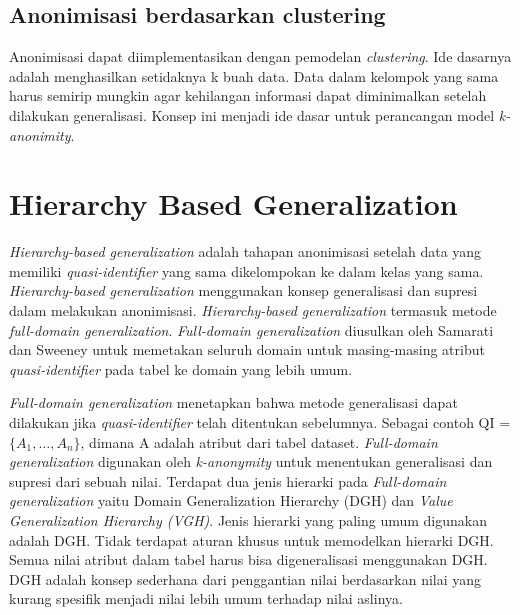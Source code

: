 \subsection{Anonimisasi berdasarkan clustering}
Anonimisasi dapat diimplementasikan dengan pemodelan \textit{clustering}. Ide dasarnya adalah menghasilkan setidaknya k buah data. Data dalam kelompok yang sama harus semirip mungkin agar kehilangan informasi dapat diminimalkan setelah dilakukan generalisasi. Konsep ini menjadi ide dasar untuk perancangan model \textit{k-anonimity}.

\section{Hierarchy Based Generalization} 
\label{theory:hierarchy_generalization}
\textit{Hierarchy-based generalization} adalah tahapan anonimisasi setelah data yang memiliki \textit{quasi-identifier} yang sama dikelompokan ke dalam kelas yang sama. \textit{Hierarchy-based generalization} menggunakan konsep generalisasi dan supresi dalam melakukan anonimisasi. \textit{Hierarchy-based generalization} termasuk metode \textit{full-domain generalization}. \textit{Full-domain generalization} diusulkan oleh Samarati dan Sweeney untuk memetakan seluruh domain untuk masing-masing atribut \textit{quasi-identifier} pada tabel ke domain yang lebih umum.

\par \textit{Full-domain generalization} menetapkan bahwa metode generalisasi dapat dilakukan jika \textit{quasi-identifier} telah ditentukan sebelumnya. Sebagai contoh QI = $\{A_1, \ldots , A_n\}$, dimana A adalah atribut dari tabel dataset. \textit{Full-domain generalization} digunakan oleh \textit{k-anonymity} untuk menentukan generalisasi dan supresi dari sebuah nilai. Terdapat dua jenis hierarki pada \textit{Full-domain generalization} yaitu Domain Generalization Hierarchy (DGH) dan \textit{Value Generalization Hierarchy (VGH)}. Jenis hierarki yang paling umum digunakan adalah DGH. Tidak terdapat aturan khusus untuk memodelkan hierarki DGH. Semua nilai atribut dalam tabel harus bisa digeneralisasi menggunakan DGH. DGH adalah konsep sederhana dari penggantian nilai berdasarkan nilai yang kurang spesifik menjadi nilai lebih umum terhadap nilai aslinya. 

